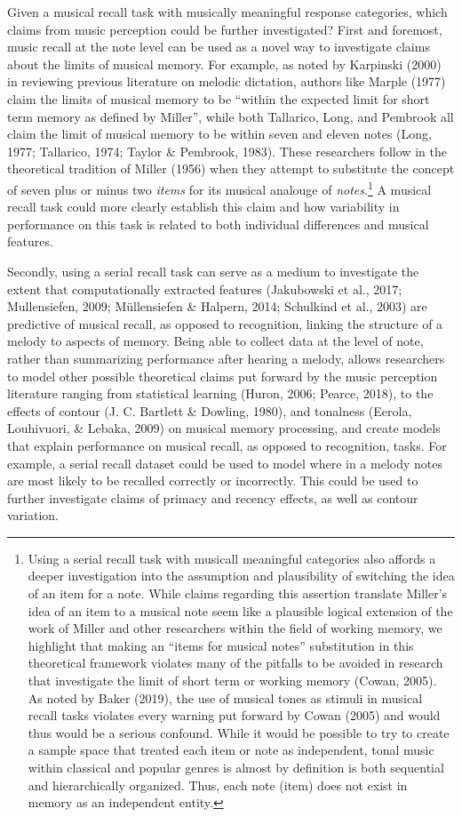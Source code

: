 \documentclass[english,man,floatsintext]{apa6}
\begin{document}
Given a musical recall task with musically meaningful response categories, which claims from music perception could be further investigated?
First and foremost, music recall at the note level can be used as a novel way to investigate claims about the limits of musical memory.
For example, as noted by Karpinski (2000) in reviewing previous literature on melodic dictation, authors like Marple (1977) claim the limits of musical memory to be \enquote{within the expected limit for short term memory as defined by Miller}, while both Tallarico, Long, and Pembrook all claim the limit of musical memory to be within seven and eleven notes (Long, 1977; Tallarico, 1974; Taylor \& Pembrook, 1983).
These researchers follow in the theoretical tradition of Miller (1956) when they attempt to substitute the concept of seven plus or minus two \emph{items} for its musical analouge of \emph{notes}.\footnote{Using a serial recall task with musicall meaningful categories also affords a deeper investigation into the assumption and plausibility of switching the idea of an item for a note. While claims regarding this assertion translate Miller's idea of an item to a musical note seem like a plausible logical extension of the work of Miller and other researchers within the field of working memory, we highlight that making an ``items for musical notes'' substitution in this theoretical framework violates many of the pitfalls to be avoided in research that investigate the limit of short term or working memory (Cowan, 2005). As noted by Baker (2019), the use of musical tones as stimuli in musical recall tasks violates every warning put forward by Cowan (2005) and would thus would be a serious confound. While it would be possible to try to create a sample space that treated each item or note as independent, tonal music within classical and popular genres is almost by definition is both sequential and hierarchically organized. Thus, each note (item) does not exist in memory as an independent entity.}
A musical recall task could more clearly establish this claim and how variability in performance on this task is related to both individual differences and musical features.

Secondly, using a serial recall task can serve as a medium to investigate the extent that computationally extracted features (Jakubowski et al., 2017; Mullensiefen, 2009; Müllensiefen \& Halpern, 2014; Schulkind et al., 2003) are predictive of musical recall, as opposed to recognition, linking the structure of a melody to aspects of memory.
Being able to collect data at the level of note, rather than summarizing performance after hearing a melody, allows researchers to model other possible theoretical claims put forward by the music perception literature ranging from statistical learning (Huron, 2006; Pearce, 2018), to the effects of contour (J. C. Bartlett \& Dowling, 1980), and tonalness (Eerola, Louhivuori, \& Lebaka, 2009) on musical memory processing, and create models that explain performance on musical recall, as opposed to recognition, tasks.
For example, a serial recall dataset could be used to model where in a melody notes are most likely to be recalled correctly or incorrectly.
This could be used to further investigate claims of primacy and recency effects, as well as contour variation.
\end{document}

